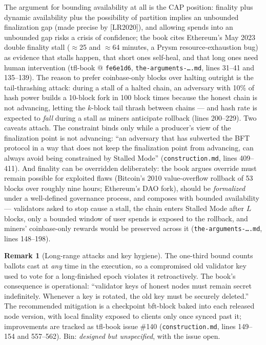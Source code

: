 \documentclass[11pt,a4paper]{article}
\theoremstyle{definition}
\newtheorem{remark}[theorem]{Remark}
\begin{document}
The argument for bounding availability at all is the CAP position:
finality plus dynamic availability plus the possibility of partition
implies an unbounded finalization gap (made precise by [LR2020]), and
allowing spends into an unbounded gap risks a crisis of confidence; the
book cites Ethereum's May 2023 double finality stall ($\approx$25 and
$\approx$64 minutes, a Prysm resource-exhaustion bug) as evidence that
stalls happen, that short ones self-heal, and that long ones need human
intervention (tfl-book @ \texttt{fe6e1d6},
\texttt{the-arguments-\ldots.md}, lines 31--41 and 135--139). The reason
to prefer coinbase-only blocks over halting outright is the
tail-thrashing attack: during a stall of a halted chain, an adversary with
10\% of hash power builds a 10-block fork in 100 block times because the
honest chain is not advancing, letting the $k$-block tail thrash between
chains --- and hash rate is expected to \emph{fall} during a stall as
miners anticipate rollback (lines 200--229). Two caveats attach. The
constraint binds only while a producer's view of the finalization point is
not advancing: ``an adversary that has subverted the BFT protocol in a way
that does not keep the finalization point from advancing, can always
avoid being constrained by Stalled Mode'' (\texttt{construction.md}, lines
409--411). And finality can be overridden deliberately: the book argues
override must remain possible for exploited flaws (Bitcoin's 2010
value-overflow rollback of 53 blocks over roughly nine hours; Ethereum's
DAO fork), should be \emph{formalized} under a well-defined governance
process, and composes with bounded availability --- validators asked to
stop cause a stall, the chain enters Stalled Mode after $L$ blocks, only a
bounded window of user spends is exposed to the rollback, and miners'
coinbase-only rewards would be preserved across it
(\texttt{the-arguments-\ldots.md}, lines 148--198).

\begin{remark}[Long-range attacks and key hygiene]\label{rem:xl-longrange}
The one-third bound counts ballots cast at \emph{any} time in the
execution, so a compromised old validator key used to vote for a
long-finished epoch violates it retroactively. The book's consequence is
operational: ``validator keys of honest nodes must remain secret
indefinitely. Whenever a key is rotated, the old key must be securely
deleted.'' The recommended mitigation is a checkpoint bft-block baked into
each released node version, with local finality exposed to clients only
once synced past it; improvements are tracked as tfl-book issue \#140
(\texttt{construction.md}, lines 149--154 and 557--562). Bin:
\emph{designed but unspecified}, with the issue open.
\end{remark}
\end{document}
